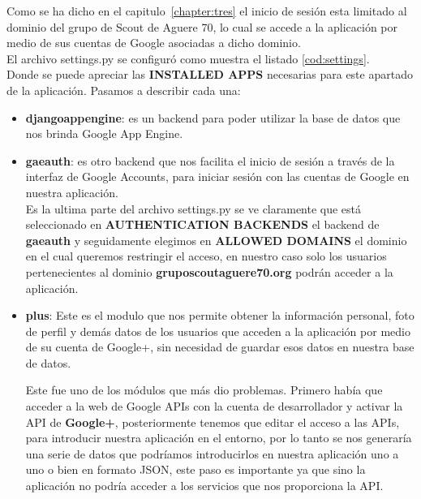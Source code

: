 Como se ha dicho en el capitulo~\ref{chapter:tres} el inicio de sesión esta limitado al dominio del grupo de Scout de Aguere 70, lo cual se accede a la aplicación
por medio de sus cuentas de Google asociadas a dicho dominio.\\

El archivo settings.py se configuró como muestra el listado \ref{cod:settings}.\\


\bigskip
Donde se puede apreciar las \textbf{INSTALLED APPS} necesarias para este apartado de la aplicación. Pasamos a describir cada una:\\
\begin{itemize}
\item \textbf{djangoappengine}: es un backend para poder utilizar la base de datos que nos brinda Google App Engine.\\

\item \textbf{gaeauth}: es otro backend que nos facilita el inicio de sesión a través de la interfaz de Google Accounts, 
para iniciar sesión con las cuentas de Google en nuestra aplicación.\\

Es la ultima parte del archivo settings.py se ve claramente que está seleccionado en \textbf{AUTHENTICATION BACKENDS} el backend de \textbf{gaeauth} y seguidamente elegimos en \textbf{ALLOWED DOMAINS} el dominio
en el cual queremos restringir el acceso, en nuestro caso solo los usuarios pertenecientes al dominio \textbf{gruposcoutaguere70.org} podrán acceder a la aplicación.

\item \textbf{plus}: Este es el modulo que nos permite obtener la información personal, foto de perfil y demás datos de los usuarios que acceden a la aplicación por medio de su cuenta de Google+, sin necesidad
de guardar esos datos en nuestra base de datos.

Este fue uno de los módulos que más dio problemas. Primero había que acceder a la web de Google APIs con la cuenta de desarrollador y activar la API de \textbf{Google+}, posteriormente tenemos que editar el acceso a las APIs,
para introducir nuestra aplicación en el entorno, por lo tanto se nos generaría una serie de datos que podríamos introducirlos en nuestra aplicación uno a uno o bien en formato JSON, este paso es importante ya que sino la aplicación
no podría acceder a los servicios que nos proporciona la API.\\

\end{itemize}

